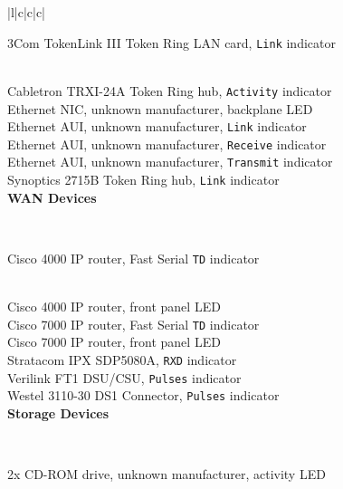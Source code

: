 \documentclass{acmtrans2e}
\begin{document}
\begin{table}
\begin{tabular}{|l|c|c|c|}
\hline

3Com TokenLink III Token Ring LAN card, {\tt Link} indicator \ClassOne
\rule{0in}{2.5ex} \\

Cabletron TRXI-24A Token Ring hub, {\tt Activity} indicator \ClassTwo \\

Ethernet NIC, unknown manufacturer, backplane LED \ClassOne \\

Ethernet AUI, unknown manufacturer, {\tt Link} indicator \ClassTwo \\

Ethernet AUI, unknown manufacturer, {\tt Receive} indicator \ClassTwo \\

Ethernet AUI, unknown manufacturer, {\tt Transmit} indicator \ClassTwo \\

Synoptics 2715B Token Ring hub, {\tt Link} indicator \ClassOne \\ [0.5ex]

\hline
{}
{\bf WAN Devices} \rule{0in}{2.5ex} \\ [0.5ex]

\hline

Cisco 4000 IP router, Fast Serial {\tt TD} indicator \ClassThree
\rule{0in}{2.5ex} \\

Cisco 4000 IP router, front panel LED \ClassTwo \\

Cisco 7000 IP router, Fast Serial {\tt TD} indicator \ClassThree \\

Cisco 7000 IP router, front panel LED \ClassTwo \\

Stratacom IPX SDP5080A, {\tt RXD} indicator \ClassTwo \\

Verilink FT1 DSU/CSU, {\tt Pulses} indicator \ClassTwo \\

Westel 3110-30 DS1 Connector, {\tt Pulses} indicator \ClassTwo \\ [0.5ex]

\hline
{}
{\bf Storage Devices} \rule{0in}{2.5ex} \\ [0.5ex]

\hline

2x CD-ROM drive, unknown manufacturer, activity LED \ClassTwo \rule{0in}{2.5ex} \\


\end{tabular}
\end{table}
\end{document}
